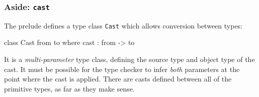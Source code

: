 \subsubsection*{Aside: \texttt{cast}}

The prelude defines a type class \texttt{Cast} which allows conversion between types:

\begin{code}
class Cast from to where
    cast : from -> to
\end{code} 

\noindent
It is a \emph{multi-parameter} type class, defining the source type and object type of the cast.
It must be possible for the type checker to infer \emph{both} parameters at the point where the cast is applied.
There are casts defined between all of the primitive types, as far as they make sense.









